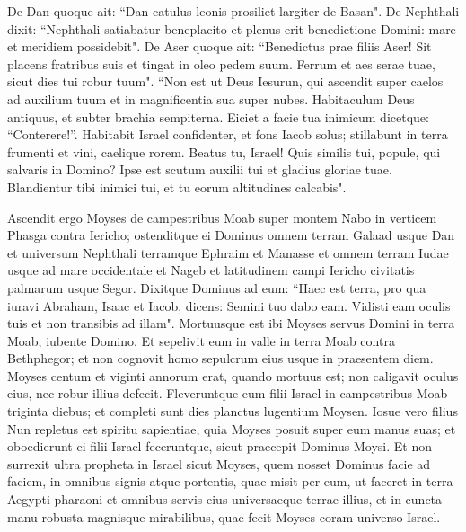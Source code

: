 \begin{biblechapter}
\verse De Dan quoque ait: “Dan catulus leonis prosiliet largiter de Basan". 
\verse De Nephthali dixit: “Nephthali satiabatur beneplacito et plenus erit benedictione Domini: mare et meridiem possidebit". 
\verse De Aser quoque ait: “Benedictus prae filiis Aser! Sit placens fratribus suis et tingat in oleo pedem suum. 
\verse Ferrum et aes serae tuae, sicut dies tui robur tuum". 
\verse “Non est ut Deus Iesurun, qui ascendit super caelos ad auxilium tuum et in magnificentia sua super nubes. 
\verse Habitaculum Deus antiquus, et subter brachia sempiterna. Eiciet a facie tua inimicum dicetque: “Conterere!”. 
\verse Habitabit Israel confidenter, et fons Iacob solus; stillabunt in terra frumenti et vini, caelique rorem. 
\verse Beatus tu, Israel! Quis similis tui, popule, qui salvaris in Domino? Ipse est scutum auxilii tui et gladius gloriae tuae. Blandientur tibi inimici tui, et tu eorum altitudines calcabis". 
\end{biblechapter}

\begin{biblechapter} 
\verse Ascendit ergo Moyses de campestribus Moab super montem Nabo in verticem Phasga contra Iericho; ostenditque ei Dominus omnem terram Galaad usque Dan 
\verse et universum Nephthali terramque Ephraim et Manasse et omnem terram Iudae usque ad mare occidentale 
\verse et Nageb et latitudinem campi Iericho civitatis palmarum usque Segor. 
\verse Dixitque Dominus ad eum: “Haec est terra, pro qua iuravi Abraham, Isaac et Iacob, dicens: Semini tuo dabo eam. Vidisti eam oculis tuis et non transibis ad illam". 
\verse Mortuusque est ibi Moyses servus Domini in terra Moab, iubente Domino. 
\verse Et sepelivit eum in valle in terra Moab contra Bethphegor; et non cognovit homo sepulcrum eius usque in praesentem diem. 
\verse Moyses centum et viginti annorum erat, quando mortuus est; non caligavit oculus eius, nec robur illius defecit.  
\verse Fleveruntque eum filii Israel in campestribus Moab triginta diebus; et completi sunt dies planctus lugentium Moysen. 
\verse Iosue vero filius Nun repletus est spiritu sapientiae, quia Moyses posuit super eum manus suas; et oboedierunt ei filii Israel feceruntque, sicut praecepit Dominus Moysi. 
\verse Et non surrexit ultra propheta in Israel sicut Moyses, quem nosset Dominus facie ad faciem, 
\verse in omnibus signis atque portentis, quae misit per eum, ut faceret in terra Aegypti pharaoni et omnibus servis eius universaeque terrae illius, 
\verse et in cuncta manu robusta magnisque mirabilibus, quae fecit Moyses coram universo Israel.
\end{biblechapter}
